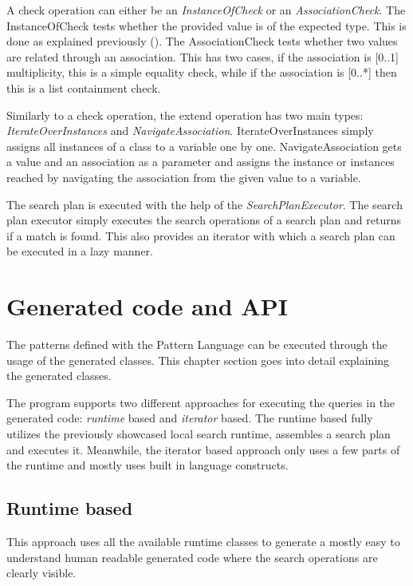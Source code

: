 A check operation can either be an \emph{InstanceOfCheck} or an
\emph{AssociationCheck}. The InstanceOfCheck tests whether the provided value is
of the expected type. This is done as explained previously
(). The AssociationCheck tests whether two values are
related through an association. This has two cases, if the association is [0..1]
multiplicity, this is a simple equality check, while if the association is
[0..*] then this is a list containment check.

Similarly to a check operation, the extend operation has two main types:
\emph{IterateOverInstances} and \emph{NavigateAssociation}. IterateOverInstances
simply assigns all instances of a class to a variable one by one.
NavigateAssociation gets a value and an association as a parameter and assigns
the instance or instances reached by navigating the association from the given
value to a variable.

The search plan is executed with the help of the \emph{SearchPlanExecutor}. The
search plan executor simply executes the search operations of a search plan and
returns if a match is found. This also provides an iterator with which a search
plan can be executed in a lazy manner.

\section{Generated code and API}\label{sect:generated_code_and_api}

The patterns defined with the \EIQ{} Pattern Language can be executed through
the usage of the generated classes. This chapter section goes into detail
explaining the generated classes.

The program supports two different approaches for executing the queries in the
generated code: \emph{runtime} based and \emph{iterator} based. The runtime
based fully utilizes the previously showcased local search runtime, assembles a
search plan and executes it. Meanwhile, the iterator based approach only uses a
few parts of the runtime and mostly uses built in language constructs.

\subsection{Runtime based}

This approach uses all the available runtime classes to generate a mostly easy
to understand human readable generated code where the search operations are
clearly visible. 

